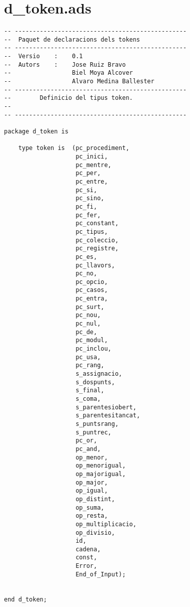 \documentclass[10pt]{report}
\begin{document}
    \section{d\_token.ads}
    \begin{lstlisting}[style=Ada]
-- ------------------------------------------------
--  Paquet de declaracions dels tokens
-- ------------------------------------------------
--  Versio    :    0.1
--  Autors    :    Jose Ruiz Bravo
--                 Biel Moya Alcover
--                 Alvaro Medina Ballester
-- ------------------------------------------------
--        Definicio del tipus token.
--
-- ------------------------------------------------

package d_token is

    type token is  (pc_procediment,
                    pc_inici,
                    pc_mentre,
                    pc_per,
                    pc_entre,
                    pc_si,
                    pc_sino,
                    pc_fi,
                    pc_fer,
                    pc_constant,
                    pc_tipus,
                    pc_coleccio,
                    pc_registre,
                    pc_es,
                    pc_llavors,
                    pc_no,
                    pc_opcio,
                    pc_casos,
                    pc_entra,
                    pc_surt,
                    pc_nou,
                    pc_nul,
                    pc_de,
                    pc_modul,
                    pc_inclou,
                    pc_usa,
                    pc_rang,
                    s_assignacio,
                    s_dospunts,
                    s_final,
                    s_coma,
                    s_parentesiobert,
                    s_parentesitancat,
                    s_puntsrang,
                    s_puntrec,
                    pc_or,
                    pc_and,
                    op_menor,
                    op_menorigual,
                    op_majorigual,
                    op_major,
                    op_igual,
                    op_distint,
                    op_suma,
                    op_resta,
                    op_multiplicacio,
                    op_divisio,
                    id,
                    cadena,
                    const,
                    Error,
                    End_of_Input);
            
                    
end d_token;
    \end{lstlisting}
    \newpage
    
    
\end{document}
